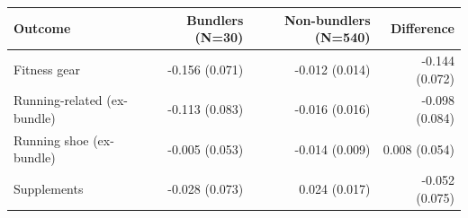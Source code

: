 \begin{tabular}{lrrr}
\toprule
Outcome & Bundlers (N=30) & Non-bundlers (N=540) & Difference \\
\midrule
Fitness gear & -0.156 (0.071) & -0.012 (0.014) & -0.144 (0.072) \\
Running-related (ex-bundle) & -0.113 (0.083) & -0.016 (0.016) & -0.098 (0.084) \\
Running shoe (ex-bundle) & -0.005 (0.053) & -0.014 (0.009) & 0.008 (0.054) \\
Supplements & -0.028 (0.073) & 0.024 (0.017) & -0.052 (0.075) \\
\bottomrule
\end{tabular}

